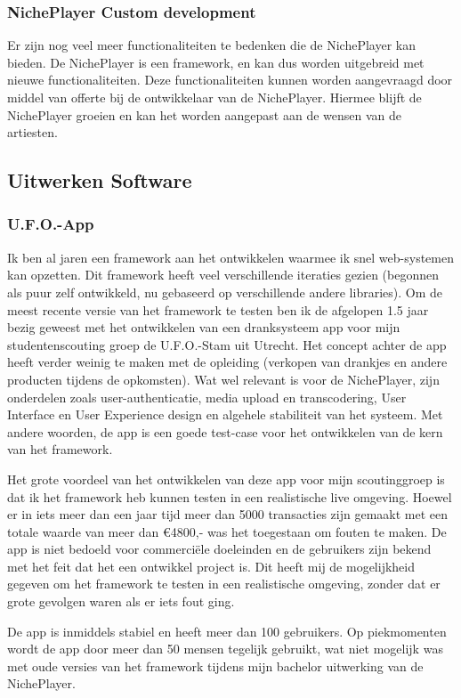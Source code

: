 \subsubsection*{NichePlayer Custom development}
Er zijn nog veel meer functionaliteiten te bedenken die de NichePlayer kan bieden. De NichePlayer is een framework, en kan dus worden uitgebreid met nieuwe functionaliteiten. Deze functionaliteiten kunnen worden aangevraagd door middel van offerte bij de ontwikkelaar van de NichePlayer. Hiermee blijft de NichePlayer groeien en kan het worden aangepast aan de wensen van de artiesten.

\subsection {Uitwerken Software}
\subsubsection*{U.F.O.-App}
Ik ben al jaren een framework aan het ontwikkelen waarmee ik snel web-systemen kan opzetten. Dit framework heeft veel verschillende iteraties gezien (begonnen als puur zelf ontwikkeld, nu gebaseerd op verschillende andere libraries). Om de meest recente versie van het framework te testen ben ik de afgelopen 1.5 jaar bezig geweest met het ontwikkelen van een dranksysteem app voor mijn studentenscouting groep de U.F.O.-Stam uit Utrecht. Het concept achter de app heeft verder weinig te maken met de opleiding (verkopen van drankjes en andere producten tijdens de opkomsten). Wat wel relevant is voor de NichePlayer, zijn onderdelen zoals user-authenticatie, media upload en transcodering, User Interface en User Experience design en algehele stabiliteit van het systeem. Met andere woorden, de app is een goede test-case voor het ontwikkelen van de kern van het framework.

Het grote voordeel van het ontwikkelen van deze app voor mijn scoutinggroep is dat ik het framework heb kunnen testen in een realistische live omgeving. Hoewel er in iets meer dan een jaar tijd meer dan 5000 transacties zijn gemaakt met een totale waarde van meer dan €4800,- was het toegestaan om fouten te maken. De app is niet bedoeld voor commerciële doeleinden en de gebruikers zijn bekend met het feit dat het een ontwikkel project is. Dit heeft mij de mogelijkheid gegeven om het framework te testen in een realistische omgeving, zonder dat er grote gevolgen waren als er iets fout ging.

De app is inmiddels stabiel en heeft meer dan 100 gebruikers. Op piekmomenten wordt de app door meer dan 50 mensen tegelijk gebruikt, wat niet mogelijk was met oude versies van het framework tijdens mijn bachelor uitwerking van de NichePlayer.

